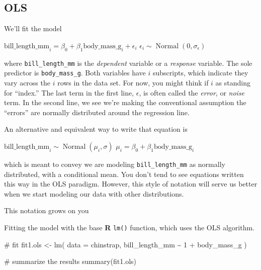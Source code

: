 \documentclass[
  letterpaper,
  DIV=11,
  numbers=noendperiod]{scrartcl}
\newenvironment{Shaded}{\begin{snugshade}}{\end{snugshade}}
\newcommand{\AttributeTok}[1]{\textcolor[rgb]{0.40,0.45,0.13}{#1}}
\newcommand{\CommentTok}[1]{\textcolor[rgb]{0.37,0.37,0.37}{#1}}
\newcommand{\DecValTok}[1]{\textcolor[rgb]{0.68,0.00,0.00}{#1}}
\newcommand{\FunctionTok}[1]{\textcolor[rgb]{0.28,0.35,0.67}{#1}}
\newcommand{\NormalTok}[1]{\textcolor[rgb]{0.00,0.23,0.31}{#1}}
\newcommand{\OtherTok}[1]{\textcolor[rgb]{0.00,0.23,0.31}{#1}}
\newcommand{\SpecialCharTok}[1]{\textcolor[rgb]{0.37,0.37,0.37}{#1}}
\begin{document}
\subsection{OLS}\label{ols}

We'll fit the model

\(\text{bill_length_mm}_i = \beta_0 + \beta_1 \text{body_mass_g}_i + \epsilon_i\)
\(\epsilon_i \sim \operatorname{Normal}(0, \sigma_\epsilon)\)

where \texttt{bill\_length\_mm} is the \emph{dependent} variable or a
\emph{response} variable. The sole predictor is \texttt{body\_mass\_g}.
Both variables have \(i\) subscripts, which indicate they vary across
the \(i\) rows in the data set. For now, you might think if \(i\) as
standing for ``index.'' The last term in the first line, \(\epsilon\),
is often called the \emph{error}, or \emph{noise} term. In the second
line, we see we're making the conventional assumption the ``errors'' are
normally distributed around the regression line.

An alternative and equivalent way to write that equation is

\(\text{bill_length_mm}_i \sim \operatorname{Normal}(\mu_i, \sigma)\)
\(\mu_i = \beta_0 + \beta_1 \text{body_mass_g}_i\)

which is meant to convey we are modeling \texttt{bill\_length\_mm} as
normally distributed, with a conditional mean. You don't tend to see
equations written this way in the OLS paradigm. However, this style of
notation will serve us better when we start modeling our data with other
distributions.

This notation grows on you

Fitting the model with the base \textbf{R} \texttt{lm()} function, which
uses the OLS algorithm.

\begin{Shaded}
\begin{Highlighting}[]
\CommentTok{\# fit}
\NormalTok{fit1.ols }\OtherTok{\textless{}{-}} \FunctionTok{lm}\NormalTok{(}
  \AttributeTok{data =}\NormalTok{ chinstrap,}
\NormalTok{  bill\_length\_mm }\SpecialCharTok{\textasciitilde{}} \DecValTok{1} \SpecialCharTok{+}\NormalTok{ body\_mass\_g}
\NormalTok{)}

\CommentTok{\# summarize the results}
\FunctionTok{summary}\NormalTok{(fit1.ols)}
\end{Highlighting}
\end{Shaded}
\end{document}
